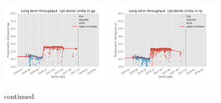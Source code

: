 \documentclass[draft]{spieman}
\begin{document}
\begin{figure}
\includegraphics[width=0.49\textwidth]{images/photzptrend-cpt-domb-1m0a-gp.png} \hspace*{\fill} 
\includegraphics[width=0.49\textwidth]{images/photzptrend-cpt-domb-1m0a-rp.png} \\[1ex]
\caption {continued}
\end{figure}
\end{document}
